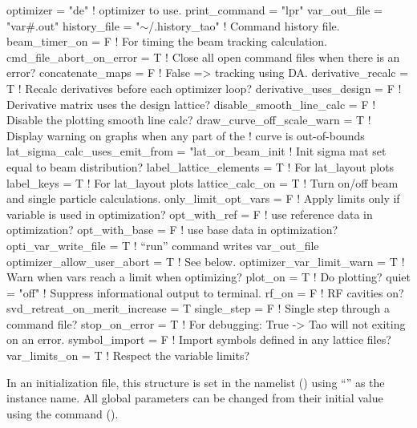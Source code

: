 {{{{{{{{{\begin{example}
  optimizer     = "de"              ! optimizer to use.
  print_command = "lpr"
  var_out_file  = "var#.out"
  history_file = "\(\sim\)/.history_tao"  ! Command history file.
  beam_timer_on = F                 ! For timing the beam tracking calculation.
  cmd_file_abort_on_error = T       ! Close all open command files when there is an error?
  concatenate_maps = F              ! False => tracking using DA.
  derivative_recalc = T             ! Recalc derivatives before each optimizer loop?
  derivative_uses_design = F        ! Derivative matrix uses the design lattice?
  disable_smooth_line_calc = F      ! Disable the plotting smooth line calc?
  draw_curve_off_scale_warn = T     ! Display warning on graphs when any part of the 
                                    !   curve is out-of-bounds
  lat_sigma_calc_uses_emit_from = "lat_or_beam_init 
                                    ! Init sigma mat set equal to beam distribution? 
  label_lattice_elements = T        ! For lat_layout plots
  label_keys = T                    ! For lat_layout plots
  lattice_calc_on = T               ! Turn on/off beam and single particle calculations.
  only_limit_opt_vars = F           ! Apply limits only if variable is used in optimization?
  opt_with_ref = F                  ! use reference data in optimization?
  opt_with_base = F                 ! use base data in optimization?
  opti_var_write_file = T           ! ``run'' command writes var_out_file
  optimizer_allow_user_abort = T    ! See below.
  optimizer_var_limit_warn = T      ! Warn when vars reach a limit when optimizing?
  plot_on = T                       ! Do plotting?
  quiet = "off"                     ! Suppress informational output to terminal.
  rf_on = F                         ! RF cavities on?
  svd_retreat_on_merit_increase = T    
  single_step = F                   ! Single step through a command file?
  stop_on_error = T                 ! For debugging: True -> Tao will not exiting on an error.
  symbol_import = F                 ! Import symbols defined in any lattice files?
  var_limits_on = T                 ! Respect the variable limits?
\end{example}

In an initialization file, this structure is set in the  namelist ()
using ``'' as the instance name. All global parameters can be changed from their initial
value using the  command ().

}}}}}}}}}
